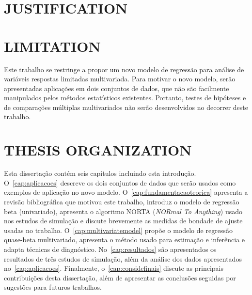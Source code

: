\section{JUSTIFICATION}

\section{LIMITATION}

Este trabalho se restringe a propor um novo modelo de regressão para
análise de variáveis respostas limitadas multivariada. Para motivar o
novo modelo, serão apresentadas aplicações em dois conjuntos de dados,
que não são facilmente manipulados pelos métodos estatísticos
existentes. Portanto, testes de hipóteses e de comparações múltiplas
multivariados não serão desenvolvidos no decorrer deste trabalho.

\section{THESIS ORGANIZATION}

Esta dissertação contém seis capítulos incluindo esta introdução.
O~\autoref{cap:aplicacoes} descreve os dois conjuntos de dados que serão
usados como exemplos de aplicação no novo modelo.
O~\autoref{cap:fundamentacaoteorica} apresenta a revisão bibliográfica
que motivou este trabalho, introduz o modelo de regressão beta
(univariado), apresenta o algoritmo NORTA (\textit{NORmal To Anything})
usado nos estudos de simulação e discute brevemente as medidas de
bondade de ajuste usadas no trabalho. O~\autoref{cap:multivariatemodel}
propõe o modelo de regressão quase-beta multivariado, apresenta o método
usado para estimação e inferência e adapta técnicas de diagnóstico.
No~\autoref{cap:resultados} são apresentados os resultados de três
estudos de simulação, além da análise dos dados apresentados
no~\autoref{cap:aplicacoes}. Finalmente, o~\autoref{cap:considefinais}
discute as principais contribuições desta dissertação, além de
apresentar as conclusões seguidas por sugestões para futuros trabalhos.

